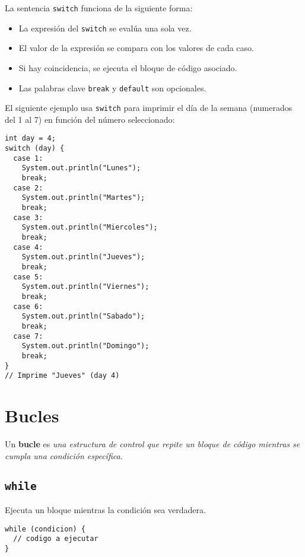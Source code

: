 \documentclass[12pt]{article}
\newcounter{it}
\theoremstyle{largebreak}
\begin{document}
    La sentencia \lstinline|switch| funciona de la siguiente forma:

    \begin{itemize}
        \item La expresión del \lstinline|switch| se evalúa una sola vez.
        \item El valor de la expresión se compara con los valores de cada caso.
        \item Si hay coincidencia, se ejecuta el bloque de código asociado.
        \item Las palabras clave \lstinline|break| y \lstinline|default| son opcionales.
    \end{itemize}

    \begin{exa}
        El siguiente ejemplo usa \lstinline|switch| para imprimir el día de la semana (numerados del 1 al 7) en función del número seleccionado:
        \begin{lstlisting}[caption={Uso de la sentencia \lstinline|switch|.},label=DescriptiveLabel]
int day = 4;
switch (day) {
  case 1:
    System.out.println("Lunes");
    break;
  case 2:
    System.out.println("Martes");
    break;
  case 3:
    System.out.println("Miercoles");
    break;
  case 4:
    System.out.println("Jueves");
    break;
  case 5:
    System.out.println("Viernes");
    break;
  case 6:
    System.out.println("Sabado");
    break;
  case 7:
    System.out.println("Domingo");
    break;
}
// Imprime "Jueves" (day 4)
        \end{lstlisting}
    \end{exa}

    \section{Bucles}

    \begin{mydef}
        Un \textbf{bucle} es \textit{una estructura de control que repite un bloque de código mientras se cumpla una condición específica}.
    \end{mydef}

    \subsection{\lstinline|while|}

    Ejecuta un bloque mientras la condición sea verdadera.

    \begin{lstlisting}[caption={Sintaxis de \lstinline|while|.},label=DescriptiveLabel]
while (condicion) {
  // codigo a ejecutar
}
    \end{lstlisting}
\end{document}
